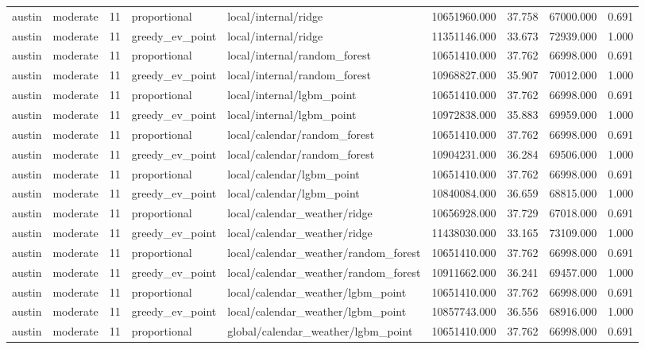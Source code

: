 \begin{tabular}{llrllrrrr}
austin & moderate & 11 & proportional & local/internal/ridge & 10651960.000 & 37.758 & 67000.000 & 0.691 \\
austin & moderate & 11 & greedy\_ev\_point & local/internal/ridge & 11351146.000 & 33.673 & 72939.000 & 1.000 \\
austin & moderate & 11 & proportional & local/internal/random\_forest & 10651410.000 & 37.762 & 66998.000 & 0.691 \\
austin & moderate & 11 & greedy\_ev\_point & local/internal/random\_forest & 10968827.000 & 35.907 & 70012.000 & 1.000 \\
austin & moderate & 11 & proportional & local/internal/lgbm\_point & 10651410.000 & 37.762 & 66998.000 & 0.691 \\
austin & moderate & 11 & greedy\_ev\_point & local/internal/lgbm\_point & 10972838.000 & 35.883 & 69959.000 & 1.000 \\
austin & moderate & 11 & proportional & local/calendar/random\_forest & 10651410.000 & 37.762 & 66998.000 & 0.691 \\
austin & moderate & 11 & greedy\_ev\_point & local/calendar/random\_forest & 10904231.000 & 36.284 & 69506.000 & 1.000 \\
austin & moderate & 11 & proportional & local/calendar/lgbm\_point & 10651410.000 & 37.762 & 66998.000 & 0.691 \\
austin & moderate & 11 & greedy\_ev\_point & local/calendar/lgbm\_point & 10840084.000 & 36.659 & 68815.000 & 1.000 \\
austin & moderate & 11 & proportional & local/calendar\_weather/ridge & 10656928.000 & 37.729 & 67018.000 & 0.691 \\
austin & moderate & 11 & greedy\_ev\_point & local/calendar\_weather/ridge & 11438030.000 & 33.165 & 73109.000 & 1.000 \\
austin & moderate & 11 & proportional & local/calendar\_weather/random\_forest & 10651410.000 & 37.762 & 66998.000 & 0.691 \\
austin & moderate & 11 & greedy\_ev\_point & local/calendar\_weather/random\_forest & 10911662.000 & 36.241 & 69457.000 & 1.000 \\
austin & moderate & 11 & proportional & local/calendar\_weather/lgbm\_point & 10651410.000 & 37.762 & 66998.000 & 0.691 \\
austin & moderate & 11 & greedy\_ev\_point & local/calendar\_weather/lgbm\_point & 10857743.000 & 36.556 & 68916.000 & 1.000 \\
austin & moderate & 11 & proportional & global/calendar\_weather/lgbm\_point & 10651410.000 & 37.762 & 66998.000 & 0.691 \\

\end{tabular}
